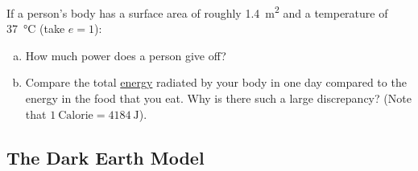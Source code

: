         \begin{exercise}
        If a person's body has a surface area of roughly \SI{1.4}{\meter^2} and a  temperature of \SI{37}{\celsius} (take $e = 1$):
            \begin{enumerate}[(a)]
                \item How much power does a person give off? 
                \item Compare the total \underline{energy} radiated by your body in one day compared to the energy in the food that you eat. Why is there such a large discrepancy? (Note that $\SI{1}{\text{Calorie}}=\SI{4184}{\joule}$).
            \end{enumerate}
            \label{ex:humans}
        \end{exercise}

    \subsection{The Dark Earth Model} %
    \label{sub:dark_earth}

